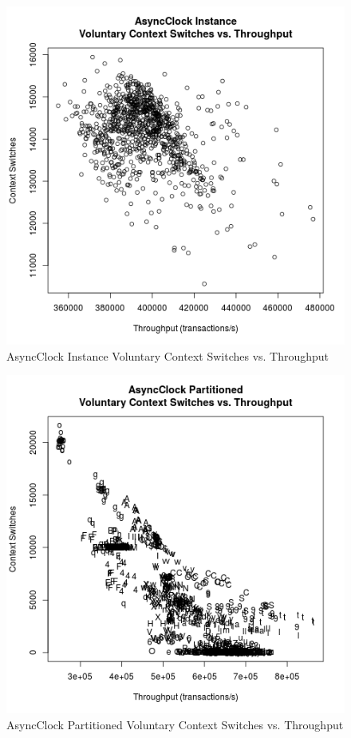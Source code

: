 \begin{figure}
\center
\includegraphics[height=.4\textheight]{async_instance_throughput_context.png}
\caption{AsyncClock Instance Voluntary Context Switches vs. Throughput}
\label{async_instance_throughput_context}
\end{figure}

\begin{figure}
\center
\includegraphics[height=.4\textheight]{async_partitioned_throughput_context.png}
\caption{AsyncClock Partitioned Voluntary Context Switches vs. Throughput}
\label{async_partitioned_throughput_context}
\end{figure}

